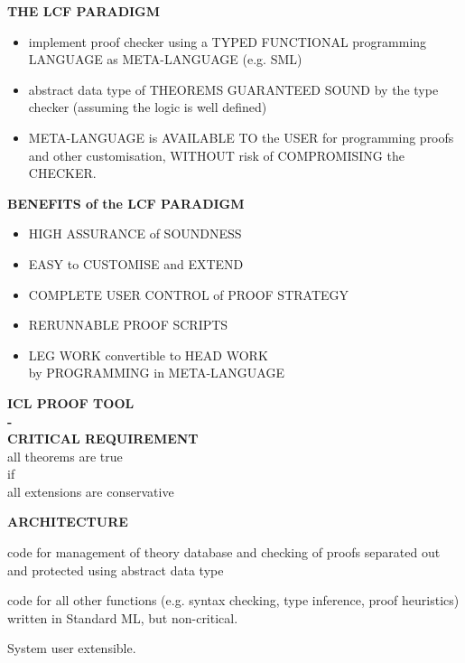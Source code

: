 \begin{slide}{}

\begin{center}
{\bf THE LCF PARADIGM}
\end{center}
\begin{itemize}
\item
implement proof checker using
a TYPED FUNCTIONAL programming LANGUAGE
as META-LANGUAGE (e.g. SML)
\item
abstract data type of THEOREMS
GUARANTEED SOUND by the type checker
(assuming the logic is well defined)
\item
META-LANGUAGE is AVAILABLE TO the USER
for programming proofs and other customisation,
WITHOUT risk of COMPROMISING the CHECKER.
\end{itemize}
\end{slide}


\begin{slide}{}

\begin{center}
{\bf BENEFITS of the LCF PARADIGM}
\end{center}

\begin{itemize}
\item
HIGH ASSURANCE of SOUNDNESS
\item
EASY to CUSTOMISE and EXTEND
\item
COMPLETE USER CONTROL
of PROOF STRATEGY
\item
RERUNNABLE PROOF SCRIPTS
\item
LEG WORK convertible to HEAD WORK\\
by PROGRAMMING in META-LANGUAGE
\end{itemize}
\end{slide}


\begin{slide}{}

\begin{center}

{\bf ICL PROOF TOOL\\
-\\
CRITICAL REQUIREMENT}\\
all theorems are true\\
if\\
all extensions are conservative

{\bf  ARCHITECTURE}

\end{center}

code for management of theory database and checking of proofs separated out and protected using abstract data type

code for all other functions (e.g. syntax checking, type inference, proof heuristics) written in Standard ML, but non-critical.

System user extensible.
\end{slide}

